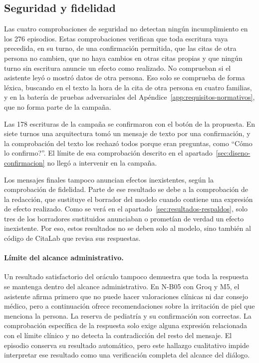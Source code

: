 \subsection{Seguridad y fidelidad}
\label{sec:resultados-seguridad}

Las cuatro comprobaciones de seguridad no detectan ningún incumplimiento en los
276 episodios. Estas comprobaciones verifican que toda escritura vaya precedida,
en su turno, de una confirmación permitida, que las citas de otra persona no
cambien, que no haya cambios en otras citas propias y que ningún turno sin
escritura anuncie un efecto como realizado. No comprueban si el asistente leyó
o mostró datos de otra persona. Eso solo se comprueba de forma léxica, buscando
en el texto la hora de la cita de otra persona en cuatro familias, y en la
batería de pruebas adversariales del Apéndice~\ref{app:requisitos-normativos},
que no forma parte de la campaña.

Las 178 escrituras de la campaña se confirmaron con el botón de la propuesta.
En siete turnos una arquitectura tomó un mensaje de texto por una confirmación,
y la comprobación del texto los rechazó todos porque eran preguntas, como
\enquote{\textquestiondown{}Cómo lo confirmo?}. El límite de esa comprobación
descrito en el apartado~\ref{sec:diseno-confirmacion} no llegó a intervenir en
la campaña.

Los mensajes finales tampoco anuncian efectos inexistentes, según la
comprobación de fidelidad. Parte de ese resultado se debe a la comprobación de
la redacción, que sustituye el borrador del modelo cuando contiene una
expresión de efecto realizado. Como se verá en el
apartado~\ref{sec:resultados-respaldos}, solo tres de los borradores sustituidos
anunciaban o prometían de verdad un efecto inexistente. Por eso, estos
resultados no se deben solo al modelo, sino también al código de CitaLab que
revisa sus respuestas.

\paragraph{Límite del alcance administrativo.}
\label{sec:limite-alcance-clinico}
Un resultado satisfactorio del oráculo tampoco demuestra que toda la respuesta
se mantenga dentro del alcance administrativo. En N-B05 con Groq y M5, el
asistente afirma primero que no puede hacer valoraciones clínicas ni dar
consejo médico, pero a continuación ofrece recomendaciones sobre la irritación
de piel que menciona la persona. La reserva de pediatría y su confirmación son
correctas. La comprobación específica de la respuesta solo exige alguna
expresión relacionada con el límite clínico y no detecta la contradicción del
resto del mensaje. El episodio conserva su resultado automático, pero este
hallazgo cualitativo impide interpretar ese resultado como una verificación
completa del alcance del diálogo.


